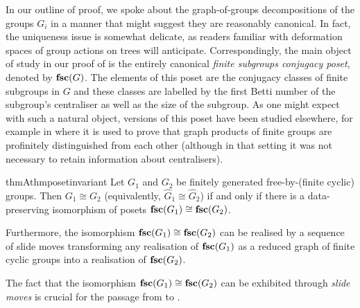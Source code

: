 \documentclass[11pt, a4 paper]{amsart}
\numberwithin{equation}{section}
\theoremstyle{remark}
\theoremstyle{definition}
\def\wh{\widehat}
\def\tsc{{\rm{\bf{fsc}}}}
\begin{document}
In our outline of proof, 
we spoke about the graph-of-groups decompositions 
of the groups $G_i$ 
in a manner that might suggest they are reasonably canonical. 
In fact, the uniqueness issue is somewhat delicate, 
as readers familiar with 
deformation spaces of group actions on trees will anticipate. 
Correspondingly, the main object of study 
in our proof of  is 
the entirely canonical \emph{finite subgroups conjugacy poset}, 
denoted by $\tsc(G)$. 
The elements of this poset 
are the conjugacy classes of finite subgroups in $G$
and these classes are labelled 
by the first Betti number of the subgroup's centraliser 
as well as the size of the subgroup. 
As one might expect with such a natural object, 
versions of this poset have been studied elsewhere, 
for example in \cite{corson2023higman} 
where it is used to prove that graph products of finite groups 
are profinitely distinguished from each other 
(although in that setting it was not necessary 
to retain information about centralisers). 

\begin{restatable}{thmA}{thmposetinvariant}
\label{thm:same_posets_implies_iso}
	Let $G_1$ and $G_2$ be finitely generated 
	free-by-(finite cyclic) groups. 
	Then $G_1\cong G_2$ (equivalently, $\wh{G}_1\cong \wh{G}_2$) 
	if and only if there is a data-preserving isomorphism 
	of posets $\tsc(G_1)\cong\tsc(G_2)$. 
	
	Furthermore, the isomorphism $\tsc(G_1)\cong\tsc(G_2)$ 
	can be realised by a sequence of slide moves 
	transforming any realisation of $\tsc(G_1)$ 
	as a reduced graph of finite cyclic groups 
	into a realisation of $\tsc(G_2)$. 
\end{restatable}


The fact that the isomorphism $\tsc(G_1)\cong\tsc(G_2)$ 
can be exhibited through \emph{slide moves} 
is crucial for the passage 
from  to . 

\bigskip
\end{document}
